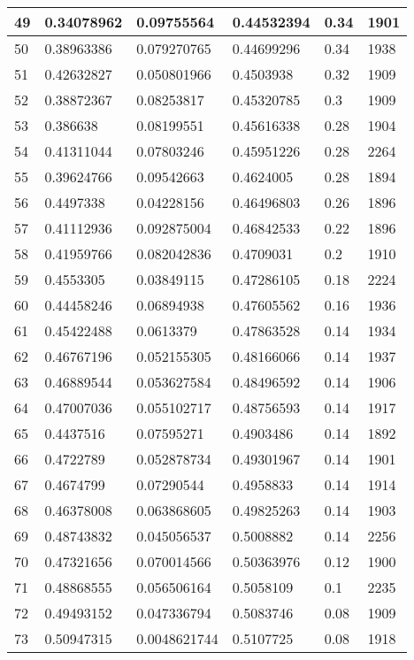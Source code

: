 \begin{longtable}{|l|l|l|l|l|l|}
49 & 0.34078962 & 0.09755564 & 0.44532394 & 0.34 & 1901 \\ \hline 
50 & 0.38963386 & 0.079270765 & 0.44699296 & 0.34 & 1938 \\ \hline 
51 & 0.42632827 & 0.050801966 & 0.4503938 & 0.32 & 1909 \\ \hline 
52 & 0.38872367 & 0.08253817 & 0.45320785 & 0.3 & 1909 \\ \hline 
53 & 0.386638 & 0.08199551 & 0.45616338 & 0.28 & 1904 \\ \hline 
54 & 0.41311044 & 0.07803246 & 0.45951226 & 0.28 & 2264 \\ \hline 
55 & 0.39624766 & 0.09542663 & 0.4624005 & 0.28 & 1894 \\ \hline 
56 & 0.4497338 & 0.04228156 & 0.46496803 & 0.26 & 1896 \\ \hline 
57 & 0.41112936 & 0.092875004 & 0.46842533 & 0.22 & 1896 \\ \hline 
58 & 0.41959766 & 0.082042836 & 0.4709031 & 0.2 & 1910 \\ \hline 
59 & 0.4553305 & 0.03849115 & 0.47286105 & 0.18 & 2224 \\ \hline 
60 & 0.44458246 & 0.06894938 & 0.47605562 & 0.16 & 1936 \\ \hline 
61 & 0.45422488 & 0.0613379 & 0.47863528 & 0.14 & 1934 \\ \hline 
62 & 0.46767196 & 0.052155305 & 0.48166066 & 0.14 & 1937 \\ \hline 
63 & 0.46889544 & 0.053627584 & 0.48496592 & 0.14 & 1906 \\ \hline 
64 & 0.47007036 & 0.055102717 & 0.48756593 & 0.14 & 1917 \\ \hline 
65 & 0.4437516 & 0.07595271 & 0.4903486 & 0.14 & 1892 \\ \hline 
66 & 0.4722789 & 0.052878734 & 0.49301967 & 0.14 & 1901 \\ \hline 
67 & 0.4674799 & 0.07290544 & 0.4958833 & 0.14 & 1914 \\ \hline 
68 & 0.46378008 & 0.063868605 & 0.49825263 & 0.14 & 1903 \\ \hline 
69 & 0.48743832 & 0.045056537 & 0.5008882 & 0.14 & 2256 \\ \hline 
70 & 0.47321656 & 0.070014566 & 0.50363976 & 0.12 & 1900 \\ \hline 
71 & 0.48868555 & 0.056506164 & 0.5058109 & 0.1 & 2235 \\ \hline 
72 & 0.49493152 & 0.047336794 & 0.5083746 & 0.08 & 1909 \\ \hline 
73 & 0.50947315 & 0.0048621744 & 0.5107725 & 0.08 & 1918 \\ \hline 

\end{longtable}
